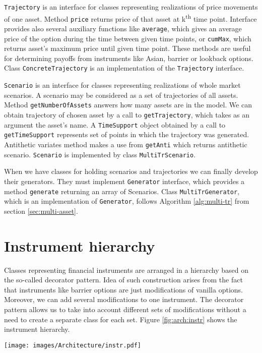 \documentclass[a4paper,11pt, twoside]{book}
\theoremstyle{definition}
\theoremstyle{remark}
\begin{document}
\texttt{Trajectory} is an interface for classes representing realizations of price movements of one asset. Method \texttt{price} returns price of that asset at k\textsuperscript{th} time point. Interface provides also several auxiliary functions like \texttt{average}, which gives an average price of the option during the time between given time points, or \texttt{cumMax}, which returns asset's maximum price until given time point. These methods are useful for determining payoffs from instruments like Asian, barrier or lookback options. Class \texttt{ConcreteTrajectory} is an implementation of the \texttt{Trajectory} interface.

\texttt{Scenario} is an interface for classes representing realizations of whole market scenarios. A scenario may be considered as a set of trajectories of all assets. Method \texttt{getNumberOfAssets} answers how many assets are in the model. We can obtain trajectory of chosen asset by a call to \texttt{getTrajectory}, which takes as an argument the asset's name. A \texttt{TimeSupport} object obtained by a call to \texttt{getTimeSupport} represents set of points in which the trajectory was generated. Antithetic variates method makes a use from \texttt{getAnti} which returns antithetic scenario. \texttt{Scenario} is implemented by class \texttt{MultiTrScenario}.

When we have classes for holding scenarios and trajectories we can finally develop their generators. They must implement \texttt{Generator} interface, which provides a method \texttt{generate} returning an array of Scenarios. Class \texttt{MultiTrGenerator}, which is an implementation of \texttt{Generator}, follows Algorithm \ref{alg:multi-tr} from section \ref{sec:multi-asset}.

\section{Instrument hierarchy}
\lstset{language=Java, basicstyle=\small}

Classes representing financial instruments are arranged in a hierarchy based on the so-called decorator pattern. Idea of such construction arises from the fact that instruments like barrier options are just modifications of vanilla options. Moreover, we can add several modifications to one instrument. The decorator pattern allows us to take into account different sets of modifications without a need to create a separate class for each set. Figure \ref{fig:arch:instr} shows the instrument hierarchy.
\begin{sidewaysfigure}
\centering
 \texttt{[image: images/Architecture/instr.pdf]}
\caption{Class diagram presenting the hierarchy of financial instruments.}
\label{fig:arch:instr}
\end{sidewaysfigure}
\end{document}
